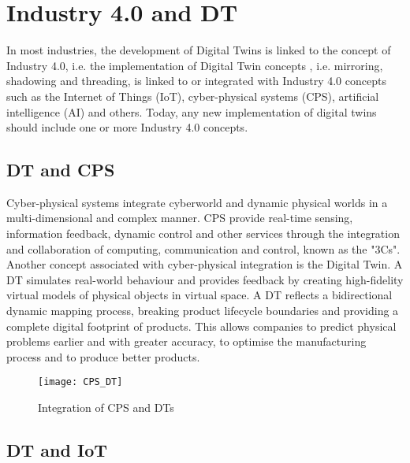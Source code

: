 \section{Industry 4.0 and DT}

In most industries, the development of Digital Twins is linked
to the concept of Industry 4.0, i.e. the implementation of Digital Twin concepts
, i.e. mirroring, shadowing and threading, is linked to or integrated with Industry 4.0 concepts
such as the Internet of Things (IoT), cyber-physical systems (CPS), artificial intelligence (AI) and others.
Today, any new implementation of digital twins should include one or more Industry 4.0 concepts.\cite{pires2019digital} \\

\subsection{DT and CPS}

Cyber-physical systems integrate cyberworld and dynamic physical worlds in a multi-dimensional and complex manner. CPS provide real-time sensing, information feedback, dynamic control and other services through the integration and collaboration of computing, communication and control, known as the "3Cs".\cite{alam2017c2ps}
\\ Another concept associated with cyber-physical integration is the Digital Twin. A DT simulates real-world behaviour and provides feedback by creating high-fidelity virtual models of physical objects in virtual space.
A DT reflects a bidirectional dynamic mapping process, breaking product lifecycle boundaries and providing a complete digital footprint of products.\cite{alam2017c2ps}
This allows companies to predict physical problems earlier and with greater accuracy, to optimise the manufacturing process and to produce better products.\cite{alam2017c2ps}

\begin{figure}[h]
    \centering
    \texttt{[image: CPS\_DT]}
    \caption{Integration of CPS and DTs}
    \label{fig:mesh2}
\end{figure}

\newpage

\subsection{DT and IoT}

